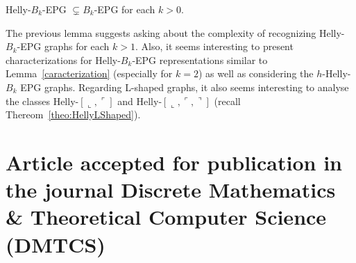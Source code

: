 \begin{lemma}
Helly-$B_k$-EPG $\subsetneq B_k$-EPG for each $k>0$.
\end{lemma}

The previous lemma suggests asking about the complexity of recognizing Helly-$B_k$-EPG graphs for each $k>1$. Also, it seems interesting to present characterizations for Helly-$B_k$-EPG representations similar to Lemma~\ref{caracterization} (especially for $k=2$) as well as considering the $h$-Helly-$B_k$ EPG graphs. Regarding L-shaped graphs, it also seems interesting to analyse the classes Helly-$[\llcorner, \ulcorner]$ and Helly-$[\llcorner, \ulcorner, \urcorner]$ (recall Thereom~\ref{theo:HellyLShaped}).




\section{Article accepted for publication in the journal  Discrete Mathematics \& Theoretical Computer Science (DMTCS)} 
